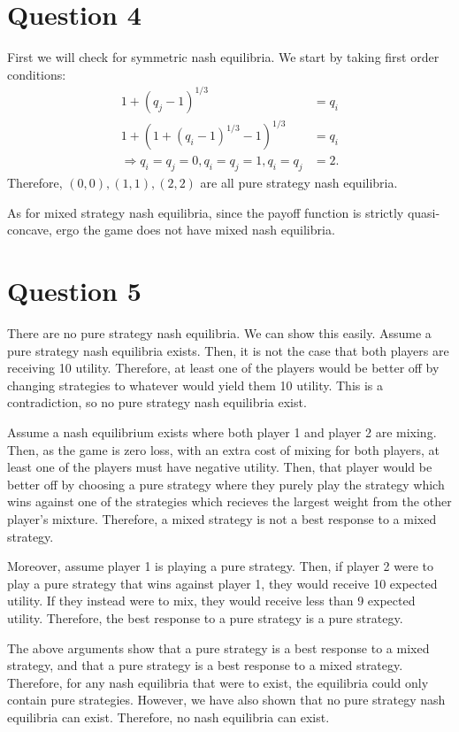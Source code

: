 \documentclass[11pt]{article} %
\begin{document}
\section{Question 4}
First we will check for symmetric nash equilibria. We start by taking first order conditions:
\begin{align*}
1+(q_j - 1)^{1/3} &= q_i\\
1+(1+(q_i - 1)^{1/3} - 1)^{1/3} &= q_i\\
\Rightarrow q_i = q_j = 0, q_i = q_j = 1, q_i = q_j &= 2.
\end{align*}
Therefore, $(0,0),(1,1),(2,2)$ are all pure strategy nash equilibria.

As for mixed strategy nash equilibria, since the payoff function is strictly quasi-concave, ergo the game does not have mixed nash equilibria.

\section{Question 5}

There are no pure strategy nash equilibria. We can show this easily. Assume a pure strategy nash equilibria exists. Then, it is not the case that both players are receiving 10 utility. Therefore, at least one of the players would be better off by changing strategies to whatever would yield them 10 utility. This is a contradiction, so no pure strategy nash equilibria exist.

Assume a nash equilibrium exists where both player 1 and player 2 are mixing. Then, as the game is zero loss, with an extra cost of mixing for both players, at least one of the players must have negative utility. Then, that player would be better off by choosing a pure strategy where they purely play the strategy which wins against one of the strategies which recieves the largest weight from the other player's mixture. Therefore, a mixed strategy is not a best response to a mixed strategy.

Moreover, assume player 1 is playing a pure strategy. Then, if player 2 were to play a pure strategy that wins against player 1, they would receive 10 expected utility. If they instead were to mix, they would receive less than 9 expected utility. Therefore, the best response to a pure strategy is a pure strategy.

The above arguments show that a pure strategy is a best response to a mixed strategy, and that a pure strategy is a best response to a mixed strategy. Therefore, for any nash equilibria that were to exist, the equilibria could only contain pure strategies. However, we have also shown that no pure strategy nash equilibria can exist. Therefore, no nash equilibria can exist.
\end{document}
